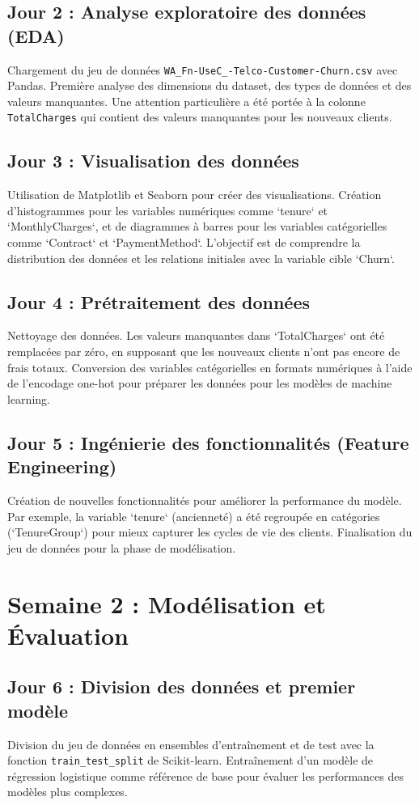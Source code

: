 \documentclass[11pt, a4paper]{report}
\begin{document}
\section{Jour 2 : Analyse exploratoire des données (EDA)}
Chargement du jeu de données \texttt{WA\_Fn-UseC\_-Telco-Customer-Churn.csv} avec Pandas. Première analyse des dimensions du dataset, des types de données et des valeurs manquantes. Une attention particulière a été portée à la colonne \texttt{TotalCharges} qui contient des valeurs manquantes pour les nouveaux clients.

\section{Jour 3 : Visualisation des données}
Utilisation de Matplotlib et Seaborn pour créer des visualisations. Création d'histogrammes pour les variables numériques comme `tenure` et `MonthlyCharges`, et de diagrammes à barres pour les variables catégorielles comme `Contract` et `PaymentMethod`. L'objectif est de comprendre la distribution des données et les relations initiales avec la variable cible `Churn`.

\section{Jour 4 : Prétraitement des données}
Nettoyage des données. Les valeurs manquantes dans `TotalCharges` ont été remplacées par zéro, en supposant que les nouveaux clients n'ont pas encore de frais totaux. Conversion des variables catégorielles en formats numériques à l'aide de l'encodage one-hot pour préparer les données pour les modèles de machine learning.

\section{Jour 5 : Ingénierie des fonctionnalités (Feature Engineering)}
Création de nouvelles fonctionnalités pour améliorer la performance du modèle. Par exemple, la variable `tenure` (ancienneté) a été regroupée en catégories (`TenureGroup`) pour mieux capturer les cycles de vie des clients. Finalisation du jeu de données pour la phase de modélisation.

\chapter{Semaine 2 : Modélisation et Évaluation}
\section{Jour 6 : Division des données et premier modèle}
Division du jeu de données en ensembles d'entraînement et de test avec la fonction \texttt{train\_test\_split} de Scikit-learn. Entraînement d'un modèle de régression logistique comme référence de base pour évaluer les performances des modèles plus complexes.
\end{document}
